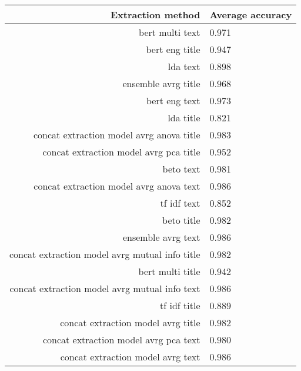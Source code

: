 \begin{tabular}{|r|l|}
  \hline
  Extraction method & Average accuracy \\ 
  \hline
  bert multi text & 0.971 \\ 
  \hline
  bert eng title & 0.947 \\ 
  \hline
  lda text & 0.898 \\ 
  \hline
  ensemble avrg title & 0.968 \\ 
  \hline
  bert eng text & 0.973 \\ 
  \hline
  lda title & 0.821 \\ 
  \hline
  concat extraction model avrg anova title & 0.983 \\ 
  \hline
  concat extraction model avrg pca title & 0.952 \\ 
  \hline
  beto text & 0.981 \\ 
  \hline
  concat extraction model avrg anova text & 0.986 \\ 
  \hline
  tf idf text & 0.852 \\ 
  \hline
  beto title & 0.982 \\ 
  \hline
  ensemble avrg text & 0.986 \\ 
  \hline
  concat extraction model avrg mutual info title & 0.982 \\ 
  \hline
  bert multi title & 0.942 \\ 
  \hline
  concat extraction model avrg mutual info text & 0.986 \\ 
  \hline
  tf idf title & 0.889 \\ 
  \hline
  concat extraction model avrg title & 0.982 \\ 
  \hline
  concat extraction model avrg pca text & 0.980 \\ 
  \hline
  concat extraction model avrg text & 0.986 \\ 
  \hline
\end{tabular}
